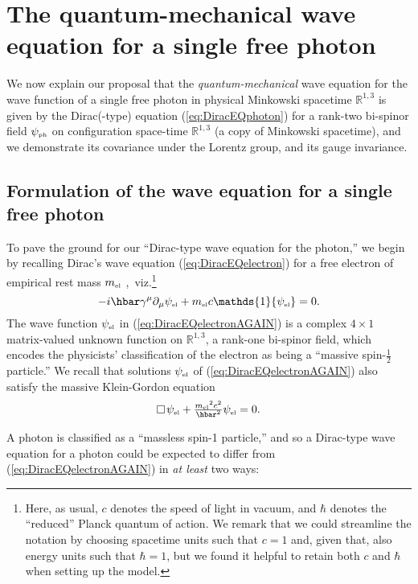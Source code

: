 \documentclass[11pt]{article}
\theoremstyle{definition}
\newcommand{\refeq}[1]{(\ref{#1})}
\numberwithin{equation}{section}
\newcommand{\beq}{\begin{equation}}
\newcommand{\eeq}{\end{equation}}
\newcommand{\Id}{\mathds{1}}
\newcommand{\psiPH}{{\psi_{\mbox{\rm\tiny ph}}}}
\newcommand{\psiEL}{{\psi_{\mbox{\rm\tiny el}}}}
\newcommand{\mEL}{{m_{\mbox{\rm\tiny el}}}}
\newcommand{\Rset}{{\mathbb R}}
\newcommand{\ga}{\gamma}
\newcommand{\dal}{\raisebox{3pt}{\fbox{}}\,}
\begin{document}
\section{The quantum-mechanical wave equation for a single free photon}\label{sec:qmwe}
%
 We now explain our proposal that the  \emph{quantum-mechanical} wave equation for the wave
function of a single free photon in physical Minkowski spacetime $\Rset^{1,3}$ is given by  
the Dirac(-type) equation \refeq{eq:DiracEQphoton} for a rank-two bi-spinor field $\psiPH$ on configuration space-time $\Rset^{1,3}$ 
(a copy of Minkowski spacetime), and we demonstrate its covariance under the Lorentz group, and its gauge invariance.

\subsection{Formulation of the wave equation for a single free photon}\label{sec:QMWE}

 To pave the ground for our ``Dirac-type wave equation for the photon,'' we begin by recalling Dirac's wave equation \refeq{eq:DiracEQelectron} 
for a free electron of empirical rest mass $\mEL$ \cite{Dirac1928a,Dirac1928b},\!~viz.\footnote{Here,
as usual, $c$ denotes the speed of light in vacuum, and $\hbar$ denotes the ``reduced'' Planck quantum of action.
 We remark that we could streamline the notation by choosing spacetime units such that $c=1$ and, given that, also
energy units such that $\hbar=1$, 
but we found it helpful to retain both $c$ and $\hbar$ when setting up the model.} 
\beq \label{eq:DiracEQelectronAGAIN} 
{ -i\hbar \ga^\mu \partial_\mu \psiEL + \mEL c \Id \psiEL =0}.
\eeq
 The wave function $\psiEL$ in \refeq{eq:DiracEQelectronAGAIN} is a complex $4\times 1$ matrix-valued unknown function on $\Rset^{1,3}$, 
a rank-one bi-spinor field, which encodes the physicists' classification of the electron as being a ``massive spin-$\frac12$ particle.''  
 We recall that solutions $\psiEL$ of \refeq{eq:DiracEQelectronAGAIN} also satisfy the massive Klein-Gordon equation
\beq \label{eq:massivKGeq}
\dal\psiEL + \tfrac{\mEL^2c^2}{\hbar^2}\psiEL =0.
\eeq

 A photon is classified as a ``massless spin-1 particle,'' and so a Dirac-type wave equation for a photon could be expected 
to differ from \refeq{eq:DiracEQelectronAGAIN} in \emph{at least} two ways: 
\end{document}
